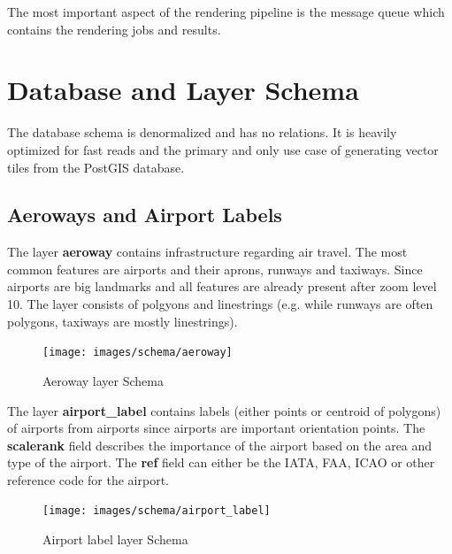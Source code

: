 The most important aspect of the rendering pipeline is the message queue which contains the rendering jobs and results.



\newpage
\section{Database and Layer Schema}\label{database-schema}

The database schema is denormalized and has no relations. It is heavily optimized for fast reads and the primary and only use case of generating vector tiles from the PostGIS database.

\subsection{Aeroways and Airport Labels}

The layer \textbf{aeroway} contains infrastructure regarding air travel. The most common features are airports and their aprons, runways and taxiways. Since airports are big landmarks and all features are already present after zoom level 10. The layer consists of polgyons and linestrings (e.g. while runways are often polygons, taxiways are mostly linestrings).

\begin{figure}[H]
  \centering
  \texttt{[image: images/schema/aeroway]}
  \caption{Aeroway layer Schema}
\end{figure}

The layer \textbf{airport\_label} contains labels (either points or centroid of polygons) of airports from airports since airports are important orientation points.
The \textbf{scalerank} field describes the importance of the airport based on the area and type of the airport.
The \textbf{ref} field can either be the IATA, FAA, ICAO or other reference code for the airport.

\begin{figure}[H]
  \centering
  \texttt{[image: images/schema/airport\_label]}
  \caption{Airport label layer Schema}
\end{figure}

